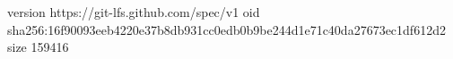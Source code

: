 version https://git-lfs.github.com/spec/v1
oid sha256:16f90093eeb4220e37b8db931cc0edb0b9be244d1e71c40da27673ec1df612d2
size 159416
